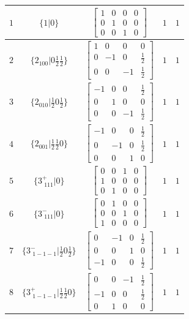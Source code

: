 \documentclass[fleqn,8pt]{jsarticle}
\begin{document}
\begin{longtable}{ccccc}
$ 1 $ & $ \{1|0\} $ & $ \begin{bmatrix} 1 & 0 & 0 & 0 \\ 0 & 1 & 0 & 0 \\ 0 & 0 & 1 & 0 \end{bmatrix} $ & $ 1 $ & $ 1 $ \\ \hline
$ 2 $ & $ \{2{}_{100}|0 \frac{1}{2} \frac{1}{2}\} $ & $ \begin{bmatrix} 1 & 0 & 0 & 0 \\ 0 & -1 & 0 & \frac{1}{2} \\ 0 & 0 & -1 & \frac{1}{2} \end{bmatrix} $ & $ 1 $ & $ 1 $ \\ \hline
$ 3 $ & $ \{2{}_{010}|\frac{1}{2} 0 \frac{1}{2}\} $ & $ \begin{bmatrix} -1 & 0 & 0 & \frac{1}{2} \\ 0 & 1 & 0 & 0 \\ 0 & 0 & -1 & \frac{1}{2} \end{bmatrix} $ & $ 1 $ & $ 1 $ \\ \hline
$ 4 $ & $ \{2{}_{001}|\frac{1}{2} \frac{1}{2} 0\} $ & $ \begin{bmatrix} -1 & 0 & 0 & \frac{1}{2} \\ 0 & -1 & 0 & \frac{1}{2} \\ 0 & 0 & 1 & 0 \end{bmatrix} $ & $ 1 $ & $ 1 $ \\ \hline
$ 5 $ & $ \{3^{+}_{\,\,111}|0\} $ & $ \begin{bmatrix} 0 & 0 & 1 & 0 \\ 1 & 0 & 0 & 0 \\ 0 & 1 & 0 & 0 \end{bmatrix} $ & $ 1 $ & $ 1 $ \\ \hline
$ 6 $ & $ \{3^{-}_{\,\,111}|0\} $ & $ \begin{bmatrix} 0 & 1 & 0 & 0 \\ 0 & 0 & 1 & 0 \\ 1 & 0 & 0 & 0 \end{bmatrix} $ & $ 1 $ & $ 1 $ \\ \hline
$ 7 $ & $ \{3^{-}_{\,\,1-1-1}|\frac{1}{2} 0 \frac{1}{2}\} $ & $ \begin{bmatrix} 0 & -1 & 0 & \frac{1}{2} \\ 0 & 0 & 1 & 0 \\ -1 & 0 & 0 & \frac{1}{2} \end{bmatrix} $ & $ 1 $ & $ 1 $ \\ \hline
$ 8 $ & $ \{3^{+}_{\,\,1-1-1}|\frac{1}{2} \frac{1}{2} 0\} $ & $ \begin{bmatrix} 0 & 0 & -1 & \frac{1}{2} \\ -1 & 0 & 0 & \frac{1}{2} \\ 0 & 1 & 0 & 0 \end{bmatrix} $ & $ 1 $ & $ 1 $ \\ \hline

\end{longtable}
\end{document}
